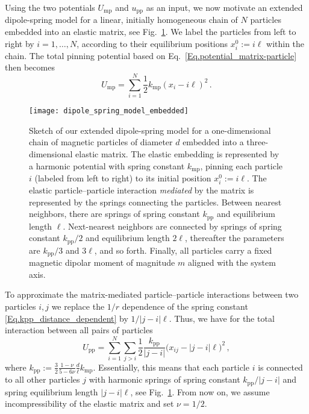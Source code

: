 \documentclass[aps,pre,twocolumn,superscriptaddress,nofootinbib]{revtex4}
\begin{document}
Using the two potentials $U_\textrm{mp}$ and $u_\textrm{pp}$ as an input, we now motivate an extended dipole-spring model for a linear, initially homogeneous chain of $N$ particles embedded into an elastic matrix, see Fig.~\ref{Fig.dipole_spring_model_embedded}. 
We label the particles from left to right by $i = 1, \dots, N$, according to their equilibrium positions $x_i^0 := i \ell$ within the chain.
The total pinning potential based on Eq.~\eqref{Eq.potential_matrix-particle} then becomes 
%
\begin{equation}
	U_\textrm{mp} = \sum_{i = 1}^N \frac{1}{2} k_\textrm{mp} (x_i - i \ell)^2 \, .
	\label{Eq.potential_matrix-particle_total}
\end{equation}
%
%
\begin{figure}
	\texttt{[image: dipole\_spring\_model\_embedded]}
	\caption{Sketch of our extended dipole-spring model for a one-dimensional chain of magnetic particles of diameter $d$ embedded into a three-dimensional elastic matrix. The elastic embedding is represented by a harmonic potential with spring constant $k_\textrm{mp}$, pinning each particle $i$ (labeled from left to right) to its initial position $x_i^0 := i \ell$. The elastic particle--particle interaction \emph{mediated} by the matrix is represented by the springs connecting the particles. Between nearest neighbors, there are springs of spring constant $k_\textrm{pp}$ and equilibrium length $\ell$. Next-nearest neighbors are connected by springs of spring constant $k_\textrm{pp}/2$ and equilibrium length $2\ell$, thereafter the parameters are $k_\textrm{pp}/3$ and $3\ell$, and so forth. Finally, all particles carry a fixed magnetic dipolar moment of magnitude $m$ aligned with the system axis.}
	\label{Fig.dipole_spring_model_embedded}
\end{figure}
%

To approximate the matrix-mediated particle--particle interactions between two particles $i,j$ we replace the $1/r$ dependence of the spring constant \eqref{Eq.kpp_distance_dependent} by $1 / |j-i| \ell$. 
Thus, we have for the total interaction between all pairs of particles
%
\begin{equation}
	U_\textrm{pp} = \sum_{i = 1}^N \sum_{j > i} \frac{1}{2} \frac{k_\textrm{pp}}{|j-i|} \big(x_{ij} - |j-i|\ell \big)^2\, , 
	\label{Eq.potential_particle-particle_total}
\end{equation}
%
where $k_\textrm{pp} := \frac{3}{2} \frac{1 - \nu}{5 - 6\nu} \frac{d}{\ell} k_\textrm{mp}$. 
Essentially, this means that each particle $i$ is connected to all other particles $j$ with harmonic springs of spring constant $k_\textrm{pp} / |j-i|$ and spring equilibrium length $|j - i|\ell$, see Fig.~\ref{Fig.dipole_spring_model_embedded}. 
From now on, we assume incompressibility of the elastic matrix and set $\nu = 1/2$. 
\end{document}

